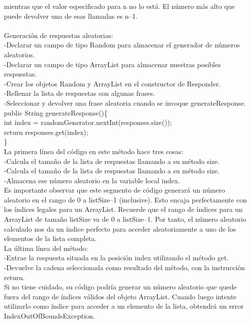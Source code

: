 \documentclass[11pt,a4paper]{article}
\begin{document}
	mientras que el valor especificado para n no lo está. El número más alto que puede devolver
	una de esas llamadas es n–1.\\
	\\
	Generación de respuestas aleatorias:\\
	-Declarar un campo de tipo Random para almacenar el generador de números aleatorios.\\
	-Declarar un campo de tipo ArrayList para almacenar nuestras posibles respuestas.\\
	-Crear los objetos Random y ArrayList en el constructor de Responder.\\
	-Rellenar la lista de respuestas con algunas frases.\\
	-Seleccionar y devolver una frase aleatoria cuando se invoque generateResponse.\\
	public String generateResponse()\{\\
	int index = randomGenerator.nextInt(responses.size());\\
	return responses.get(index);\\
	\}	\\
	La primera línea del código en este método hace tres cosas:\\
	-Calcula el tamaño de la lista de respuestas llamando a su método size.\\
	-Calcula el tamaño de la lista de respuestas llamando a su método size.\\
	-Almacena ese número aleatorio en la variable local index.\\
	Es importante observar que este segmento de código generará un número aleatorio en el rango
	de 0 a listSize–1 (inclusive). Esto encaja perfectamente con los índices legales para un
	ArrayList. Recuerde que el rango de índices para un ArrayList de tamaño listSize va
	de 0 a listSize–1. Por tanto, el número aleatorio calculado nos da un índice perfecto para
	acceder aleatoriamente a uno de los elementos de la lista completa.
	\\
	La última línea del método:\\
	-Extrae la respuesta situada en la posición index utilizando el método get.\\
	-Devuelve la cadena seleccionada como resultado del método, con la instrucción return.\\
	Si no tiene cuidado, su código podría generar un número aleatorio que quede fuera del rango de
	índices válidos del objeto ArrayList. Cuando luego intente utilizarlo como índice para acceder a
	un elemento de la lista, obtendrá un error IndexOutOfBoundsException.\\ 
\end{document}
